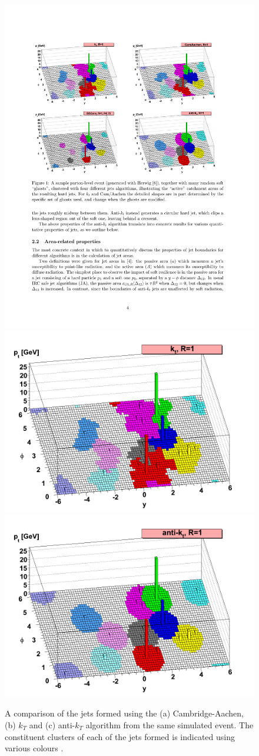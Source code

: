 \begin{figure}[!ht]
  \captionsetup[subfigure]{aboveskip=-5pt,justification=centering}
  \begin{center}
     {
      \includegraphics[width=0.45\linewidth, angle=0]{figs/Objects/jets_reco_shapes_ca.pdf}
    }
     {
      \includegraphics[width=0.45\linewidth, angle=0]{figs/Objects/jets_reco_shapes_kt.png}
    }\\
     {
      \includegraphics[width=0.45\linewidth, angle=0]{figs/Objects/jets_reco_shapes_akt.png}
    }

  \end{center}
  \caption[A comparison of the jets formed using the (a) Cambridge-Aachen, (b) $k_T$ and (c) anti-$k_T$ algorithm from the same simulated event.
    The constituent clusters of each of the jets formed is indicated using various colours.]
          {A comparison of the jets formed using the (a) Cambridge-Aachen, (b) $k_T$ and (c) anti-$k_T$ algorithm from the same simulated event.
            The constituent clusters of each of the jets formed is indicated using various colours \cite{obj-jets_reco_akt}.}
  \label{fig:obj-jets_reco_shapes}
\end{figure}

